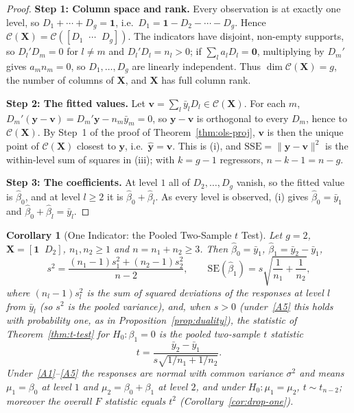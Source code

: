 \documentclass[14pt]{extarticle}
\theoremstyle{plain}
\newtheorem{corollary}[theorem]{Corollary}
\theoremstyle{definition}
\theoremstyle{remark}
\newcommand{\SSE}{\mathrm{SSE}}
\newcommand{\SE}{\mathrm{SE}}
\newcommand{\bX}{\mathbf{X}}
\newcommand{\by}{\mathbf{y}}
\newcommand{\bone}{\mathbf{1}}
\newcommand{\bzero}{\mathbf{0}}
\newcommand{\bv}{\mathbf{v}}
\newcommand{\calC}{\mathcal{C}}
\begin{document}
\begin{proof}
\textbf{Step 1: Column space and rank.} Every observation is at exactly one level, so $D_1 + \cdots + D_g = \bone$, i.e.\ $D_1 = \bone - D_2 - \cdots - D_g$. Hence $\calC(\bX) = \calC([D_1 \;\; \cdots \;\; D_g])$. The indicators have disjoint, non-empty supports, so $D_l'D_m = 0$ for $l \neq m$ and $D_l'D_l = n_l > 0$; if $\sum_l a_lD_l = \bzero$, multiplying by $D_m'$ gives $a_mn_m = 0$, so $D_1, \ldots, D_g$ are linearly independent. Thus $\dim\calC(\bX) = g$, the number of columns of $\bX$, and $\bX$ has full column rank.

\textbf{Step 2: The fitted values.} Let $\bv = \sum_l\bar y_lD_l \in \calC(\bX)$. For each $m$, $D_m'(\by - \bv) = D_m'\by - n_m\bar y_m = 0$, so $\by - \bv$ is orthogonal to every $D_m$, hence to $\calC(\bX)$. By Step~1 of the proof of Theorem~\ref{thm:ols-proj}, $\bv$ is then the unique point of $\calC(\bX)$ closest to $\by$, i.e.\ $\hat{\by} = \bv$. This is (i), and $\SSE = \|\by - \bv\|^2$ is the within-level sum of squares in (iii); with $k = g - 1$ regressors, $n - k - 1 = n - g$.

\textbf{Step 3: The coefficients.} At level $1$ all of $D_2, \ldots, D_g$ vanish, so the fitted value is $\hat\beta_0$, and at level $l \geqslant 2$ it is $\hat\beta_0 + \hat\beta_l$. As every level is observed, (i) gives $\hat\beta_0 = \bar y_1$ and $\hat\beta_0 + \hat\beta_l = \bar y_l$.
\end{proof}

\begin{corollary}[One Indicator: the Pooled Two-Sample $t$ Test]\label{cor:two-sample}
Let $g = 2$, $\bX = [\bone \;\; D_2]$, $n_1, n_2 \geqslant 1$ and $n = n_1 + n_2 \geqslant 3$. Then $\hat\beta_0 = \bar y_1$, $\hat\beta_1 = \bar y_2 - \bar y_1$,
\[
s^2 = \frac{(n_1 - 1)s_1^2 + (n_2 - 1)s_2^2}{n - 2}, \qquad \SE(\hat\beta_1) = s\sqrt{\frac{1}{n_1} + \frac{1}{n_2}},
\]
where $(n_l - 1)s_l^2$ is the sum of squared deviations of the responses at level $l$ from $\bar y_l$ (so $s^2$ is the pooled variance), and, when $s > 0$ (under~\ref{A5} this holds with probability one, as in Proposition~\ref{prop:duality}), the statistic of Theorem~\ref{thm:t-test} for $H_0\colon \beta_1 = 0$ is the pooled two-sample $t$ statistic
\[
t = \frac{\bar y_2 - \bar y_1}{s\sqrt{1/n_1 + 1/n_2}}.
\]
Under~\ref{A1}--\ref{A5} the responses are normal with common variance $\sigma^2$ and means $\mu_1 = \beta_0$ at level $1$ and $\mu_2 = \beta_0 + \beta_1$ at level $2$, and under $H_0\colon \mu_1 = \mu_2$, $t \sim t_{n-2}$; moreover the overall $F$ statistic equals $t^2$ (Corollary~\ref{cor:drop-one}).
\end{corollary}
\end{document}
